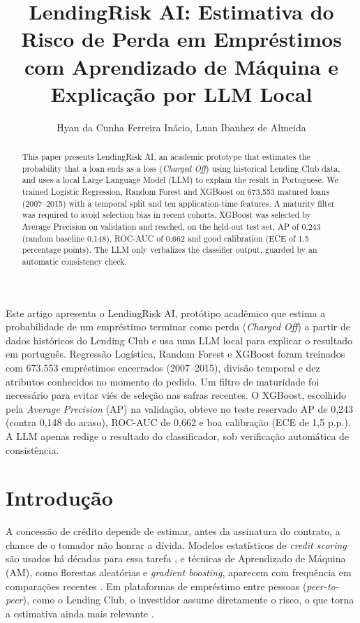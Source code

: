 \documentclass[12pt]{article}
\title{LendingRisk AI: Estimativa do Risco de Perda em Empréstimos\\
  com Aprendizado de Máquina e Explicação por LLM Local}
\author{Hyan da Cunha Ferreira Inácio\inst{1}, Luan Ibanhez de Almeida\inst{1}}
\begin{document}
\maketitle

\begin{abstract}
  This paper presents LendingRisk AI, an academic prototype that estimates the
  probability that a loan ends as a loss (\textit{Charged Off}) using historical
  Lending Club data, and uses a local Large Language Model (LLM) to explain the
  result in Portuguese. We trained Logistic Regression, Random Forest and XGBoost
  on 673,553 matured loans (2007--2015) with a temporal split and ten
  application-time features. A maturity filter was required to avoid selection
  bias in recent cohorts. XGBoost was selected by Average Precision on validation
  and reached, on the held-out test set, AP of 0.243 (random baseline 0.148),
  ROC-AUC of 0.662 and good calibration (ECE of 1.5 percentage points). The LLM
  only verbalizes the classifier output, guarded by an automatic consistency check.
\end{abstract}

\begin{resumo}
  Este artigo apresenta o LendingRisk AI, protótipo acadêmico que estima a
  probabilidade de um empréstimo terminar como perda (\textit{Charged Off}) a
  partir de dados históricos do Lending Club e usa uma LLM local para explicar o
  resultado em português. Regressão Logística, Random Forest e XGBoost foram
  treinados com 673.553 empréstimos encerrados (2007--2015), divisão temporal e
  dez atributos conhecidos no momento do pedido. Um filtro de maturidade foi
  necessário para evitar viés de seleção nas safras recentes. O XGBoost,
  escolhido pela \textit{Average Precision} (AP) na validação, obteve no teste
  reservado AP de 0,243 (contra 0,148 do acaso), ROC-AUC de 0,662 e boa
  calibração (ECE de 1,5 p.p.). A LLM apenas redige o resultado do classificador,
  sob verificação automática de consistência.
\end{resumo}


\section{Introdução}

A concessão de crédito depende de estimar, antes da assinatura do contrato, a
chance de o tomador não honrar a dívida. Modelos estatísticos de \textit{credit
scoring} são usados há décadas para essa tarefa \cite{thomas2017credit}, e
técnicas de Aprendizado de Máquina (AM), como florestas aleatórias e
\textit{gradient boosting}, aparecem com frequência em comparações recentes
\cite{lessmann2015benchmarking}. Em plataformas de empréstimo entre pessoas
(\textit{peer-to-peer}), como o Lending Club, o investidor assume diretamente o
risco, o que torna a estimativa ainda mais relevante \cite{serrano2015determinants}.
\end{document}
